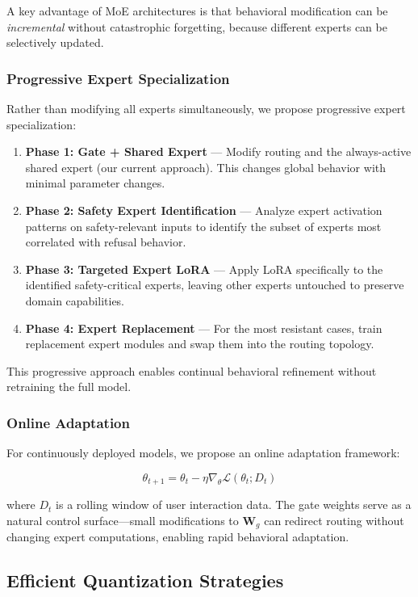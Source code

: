 \documentclass[11pt,a4paper]{article}
\begin{document}
A key advantage of MoE architectures is that behavioral modification can be \textit{incremental} without catastrophic forgetting, because different experts can be selectively updated.

\subsubsection{Progressive Expert Specialization}

Rather than modifying all experts simultaneously, we propose progressive expert specialization:

\begin{enumerate}
    \item \textbf{Phase 1: Gate + Shared Expert} — Modify routing and the always-active shared expert (our current approach). This changes global behavior with minimal parameter changes.
    \item \textbf{Phase 2: Safety Expert Identification} — Analyze expert activation patterns on safety-relevant inputs to identify the subset of experts most correlated with refusal behavior.
    \item \textbf{Phase 3: Targeted Expert LoRA} — Apply LoRA specifically to the identified safety-critical experts, leaving other experts untouched to preserve domain capabilities.
    \item \textbf{Phase 4: Expert Replacement} — For the most resistant cases, train replacement expert modules and swap them into the routing topology.
\end{enumerate}

This progressive approach enables continual behavioral refinement without retraining the full model.

\subsubsection{Online Adaptation}

For continuously deployed models, we propose an online adaptation framework:

$$\theta_{t+1} = \theta_t - \eta \nabla_\theta \mathcal{L}(\theta_t; D_t)$$

where $D_t$ is a rolling window of user interaction data. The gate weights serve as a natural control surface—small modifications to $\mathbf{W}_g$ can redirect routing without changing expert computations, enabling rapid behavioral adaptation.

\subsection{Efficient Quantization Strategies}
\end{document}
